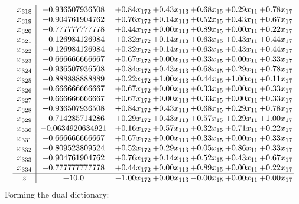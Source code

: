 \documentclass[8pt]{article}
\begin{document}
\[\begin{array}{c| c c@{\hskip 2pt} c@{\hskip 2pt} c@{\hskip 2pt} c@{\hskip 2pt} c@{\hskip 2pt} }
 x_{318}   &  -0.936507936508 & +  0.84 x_{172} & +  0.43 x_{113} & +  0.68 x_{15} & +  0.29 x_{11} & +  0.78 x_{17}\\
 x_{319}   &  -0.904761904762 & +  0.76 x_{172} & +  0.14 x_{113} & +  0.52 x_{15} & +  0.43 x_{11} & +  0.67 x_{17}\\
 x_{320}   &  -0.777777777778 & +  0.44 x_{172} & +  0.00 x_{113} & +  0.89 x_{15} & +  0.00 x_{11} & +  0.22 x_{17}\\
 x_{321}   &  -0.126984126984 & +  0.32 x_{172} & +  0.14 x_{113} & +  0.63 x_{15} & +  0.43 x_{11} & +  0.44 x_{17}\\
 x_{322}   &  -0.126984126984 & +  0.32 x_{172} & +  0.14 x_{113} & +  0.63 x_{15} & +  0.43 x_{11} & +  0.44 x_{17}\\
 x_{323}   &  -0.666666666667 & +  0.67 x_{172} & +  0.00 x_{113} & +  0.33 x_{15} & +  0.00 x_{11} & +  0.33 x_{17}\\
 x_{324}   &  -0.936507936508 & +  0.84 x_{172} & +  0.43 x_{113} & +  0.68 x_{15} & +  0.29 x_{11} & +  0.78 x_{17}\\
 x_{325}   &  -0.888888888889 & +  0.22 x_{172} & +  1.00 x_{113} & +  0.44 x_{15} & +  1.00 x_{11} & +  0.11 x_{17}\\
 x_{326}   &  -0.666666666667 & +  0.67 x_{172} & +  0.00 x_{113} & +  0.33 x_{15} & +  0.00 x_{11} & +  0.33 x_{17}\\
 x_{327}   &  -0.666666666667 & +  0.67 x_{172} & +  0.00 x_{113} & +  0.33 x_{15} & +  0.00 x_{11} & +  0.33 x_{17}\\
 x_{328}   &  -0.936507936508 & +  0.84 x_{172} & +  0.43 x_{113} & +  0.68 x_{15} & +  0.29 x_{11} & +  0.78 x_{17}\\
 x_{329}   &  -0.714285714286 & +  0.29 x_{172} & +  0.43 x_{113} & +  0.57 x_{15} & +  0.29 x_{11} & +  1.00 x_{17}\\
 x_{330}   &  -0.0634920634921 & +  0.16 x_{172} & +  0.57 x_{113} & +  0.32 x_{15} & +  0.71 x_{11} & +  0.22 x_{17}\\
 x_{331}   &  -0.666666666667 & +  0.67 x_{172} & +  0.00 x_{113} & +  0.33 x_{15} & +  0.00 x_{11} & +  0.33 x_{17}\\
 x_{332}   &  -0.809523809524 & +  0.52 x_{172} & +  0.29 x_{113} & +  0.05 x_{15} & +  0.86 x_{11} & +  0.33 x_{17}\\
 x_{333}   &  -0.904761904762 & +  0.76 x_{172} & +  0.14 x_{113} & +  0.52 x_{15} & +  0.43 x_{11} & +  0.67 x_{17}\\
 x_{334}   &  -0.777777777778 & +  0.44 x_{172} & +  0.00 x_{113} & +  0.89 x_{15} & +  0.00 x_{11} & +  0.22 x_{17}\\
\hline
z    &  -10.0 & -1.00 x_{172} & +  0.00 x_{113} & -0.00 x_{15} & +  0.00 x_{11} & +  0.00 x_{17}\\
\end{array}\]
Forming the dual dictionary:
\end{document}
